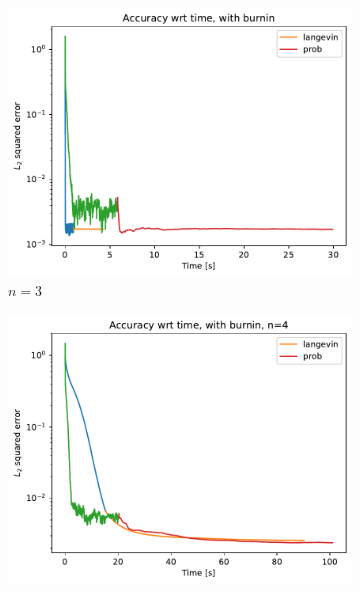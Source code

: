 \documentclass[12pt]{memoir}
\begin{document}
\begin{figure}[H]
    \centering
    \begin{subfigure}[b]{0.49\textwidth}
        \centering
        \includegraphics[width=\textwidth]{figures/experiments/baseline/diff_n_qubits/iters_acc_comp_time_no_avg-1.png}
        \caption{$n=3$}
        \label{fig:conv-plot-time-diff-n-3-sub}
    \end{subfigure}
    \hfill
    \begin{subfigure}[b]{0.49\textwidth}
        \centering
        \includegraphics[width=\textwidth]{figures/experiments/baseline/diff_n_qubits/iters_acc_comp_time_no_avg_n4-1.png}

\end{subfigure}
\end{figure}
\end{document}
